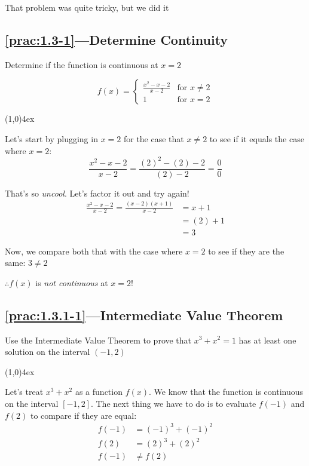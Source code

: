 \documentclass{MathNotes}
\newcommand{\br}{
\begin{center}
\line(1,0){4ex}
\end{center}}
\begin{document}
That problem was quite tricky, but we did it 

\subsection*{\ref{prac:1.3-1}---Determine Continuity}\label{ans:1.3-1}
Determine if the function is continuous at $x=2$

\begin{displaymath}
    f(x) = \begin{cases}
        \frac{x^2-x-2}{x-2} &\text{for } x\neq 2\\
        1 &\text{for } x=2
    \end{cases}
\end{displaymath}
\br

Let's start by plugging in $x=2$ for the case that $x\neq2$ to see if it equals
the case where $x=2$:
\begin{displaymath}
    \frac{x^2-x-2}{x-2}=\frac{(2)^2-(2)-2}{(2)-2}=\frac{0}{0}
\end{displaymath}

That's so \textit{uncool}. Let's factor it out and try again!
\begin{align*}
    \frac{x^2-x-2}{x-2} = \frac{(x-2)(x+1)}{x-2} &= x+1\\
    &=(2)+1\\
    &=3
\end{align*}

Now, we compare both that with the case where $x=2$ to see if they
are the same: $3\neq2$

$\therefore f(x)$ is \textit{not continuous} at $x=2$!

\newpage
\subsection*{\ref{prac:1.3.1-1}---Intermediate Value Theorem}\label{ans:1.3.1-1}
Use the Intermediate Value Theorem to prove that $x^3+x^2=1$ has at least
one solution on the interval $(-1, 2)$
\br
Let's treat $x^3+x^2$ as a function $f(x)$. We know that the function is 
continuous on the interval $[-1, 2]$. The next thing we have to do is to 
evaluate $f(-1)$ and $f(2)$ to compare if they are equal:
\begin{align*}
    f(-1)&=(-1)^3+(-1)^2\\
    f(2)&=(2)^3+(2)^2\\
    f(-1)&\neq f(2)\\
\end{align*}
\end{document}
